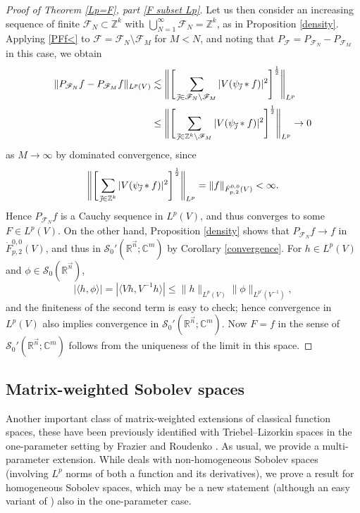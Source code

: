 \documentclass[11pt, reqno]{amsart}
\theoremstyle{definition}
\theoremstyle{remark}
\numberwithin{equation}{section}
\newcommand{\C}{\mathbb C}
\newcommand{\Fs}{\mathscr F}
\newcommand{\R}{\mathbb R}
\newcommand{\Sc}{\mathscr S}
\newcommand{\Z}{\mathbb Z}
\newcommand{\vj}{\vec{\textit{\j}}}
\newcommand{\vn}{\vec n}
\newcommand{\pair}[2]{\langle #1, #2 \rangle}
\newcommand{\abs}[1]{|#1|}
\newcommand{\Norm}[2]{\|#1\|_{#2}}
\begin{document}
\begin{proof}[Proof of Theorem \ref{Lp=F}, part \eqref{F subset Lp}]
Let us then consider an increasing sequence of finite $\Fs_N\subset\Z^k$ with $\bigcup_{N=1}^\infty\Fs_N=\Z^k$, as in Proposition \ref{density}. Applying \eqref{PFf<} to $\Fs=\Fs_N\setminus\Fs_M$ for $M<N$, and noting that $P_{\Fs}=P_{\Fs_N}-P_{\Fs_M}$ in this case, we obtain
\begin{align*}
\Norm{P_{\Fs_N} f-P_{\Fs_M} f}{L^p(V)}
&\lesssim \Bigg\| \Bigg[ \sum_{\vj\in\Fs_N\setminus\Fs_M} \abs{V(\psi_{\vj}*f)}^2 \Bigg]^{\frac{1}{2}} \Bigg\|_{L^p} \\
&\leq \Bigg\| \Bigg[ \sum_{\vj\in\Z^k\setminus\Fs_M} \abs{V(\psi_{\vj}*f)}^2 \Bigg]^{\frac{1}{2}} \Bigg\|_{L^p}
\to 0
\end{align*}
as $M\to\infty$ by dominated convergence, since
\begin{equation*}
\Bigg\| \Bigg[ \sum_{\vj\in\Z^k} \abs{V(\psi_{\vj}*f)}^2 \Bigg]^{\frac{1}{2}} \Bigg\|_{L^p}
=\Norm{f}{\dot F^{0,0}_{p,2}(V)}<\infty.
\end{equation*}
Hence $P_{\Fs_N} f$ is a Cauchy sequence in $L^p(V)$, and thus converges to some $F\in L^p(V)$. On the other hand, Proposition \ref{density} shows that $P_{\Fs_N} f\to f$ in $\dot F^{0,0}_{p,2}(V)$, and thus in $\Sc_0'(\R^{\vn};\C^m)$ by Corollary \ref{convergence}. For $h\in L^p(V)$ and $\phi\in\Sc_0(\R^{\vn})$,
\begin{equation*}
\abs{\pair{h}{\phi}}=\abs{\pair{Vh}{V^{-1}h}}\leq\Norm{h}{L^p(V)}\Norm{\phi}{L^{p'}(V^{-1})},
\end{equation*}
and the finiteness of the second term is easy to check; hence convergence in $L^p(V)$ also implies convergence in $\Sc_0'(\R^{\vn};\C^m)$.
Now $F=f$ in the sense of $\Sc_0'(\R^{\vn};\C^m)$ follows from the uniqueness of the limit in this space.
\end{proof}

\subsection{Matrix-weighted Sobolev spaces}\label{sec:Sobolev}

Another important class of matrix-weighted extensions of classical function spaces, these have been previously identified with Triebel--Lizorkin spaces in the one-parameter setting by Frazier and Roudenko \cite[Proposition 1.4]{FR21}. As usual, we provide a multi-parameter extension. While \cite[Proposition 1.4]{FR21} deals with non-homogeneous Sobolev spaces (involving $L^p$ norms of both a function and its derivatives), we prove a result for homogeneous Sobolev spaces, which may be a new statement (although an easy variant of \cite[Proposition 1.4]{FR21}) also in the one-parameter case.
\end{document}
